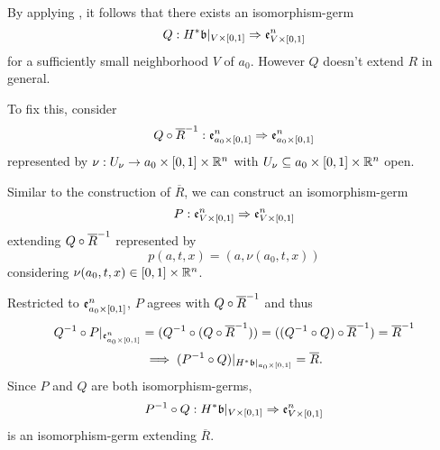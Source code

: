 \begin{myproof}
    By applying ,
    it follows that there exists an isomorphism-germ
    \[ Q: H^*\mathfrak{b}\vert_{V \times{} [0, 1]} \Rightarrow{} \mathfrak{e}^{n}_{V \times{} [0, 1]} \]
    for a sufficiently small neighborhood $V$ of $a_0$.
    However $Q$ doesn't extend $R$ in general.

    To fix this, consider
    \[ Q \circ \overline{R}^{-1}: \mathfrak{e}^{n}_{a_0 \times{} [0, 1]} \Rightarrow{} \mathfrak{e}^{n}_{a_0 \times{} [0, 1]} \]
    represented by $\nu: U_\nu \to a_0 \times{} [0, 1] \times \mathbb{R}^n$
    with $U_\nu \subseteq{} a_0 \times{} [0, 1] \times \mathbb{R}^n$ open.

    Similar to the construction of $\overline{R}$, we can construct an isomorphism-germ
    \[ P: \mathfrak{e}^{n}_{V \times{} [0, 1]} \Rightarrow{} \mathfrak{e}^{n}_{V \times{} [0, 1]} \]
    extending $Q \circ \overline{R}^{-1}$ represented by
    \[ p(a, t, x) = (a, \nu(a_0, t, x)) \]
    considering $\nu(a_0, t, x) \in [0, 1] \times \mathbb{R}^n$.

    Restricted to $\mathfrak{e}^{n}_{a_0 \times{} [0, 1]}$, $P$ agrees with $Q \circ \overline{R}^{-1}$ and thus
    \[
        Q^{-1} \circ P\vert_{\mathfrak{e}^{n}_{a_0 \times{} [0, 1]}}
        = (Q^{-1} \circ (Q \circ \overline{R}^{-1}))
        = ((Q^{-1} \circ Q) \circ \overline{R}^{-1})
        = \overline{R}^{-1}
    \]
    \[ \implies (P^{-1} \circ Q)\vert_{H^*\mathfrak{b}\vert_{a_0 \times{} [0, 1]}} = \overline{R}. \]
    Since $P$ and $Q$ are both isomorphism-germs,
    \[ P^{-1} \circ Q: H^*\mathfrak{b}\vert_{V \times{} [0, 1]} \Rightarrow{} \mathfrak{e}^{n}_{V \times{} [0, 1]} \]
    is an isomorphism-germ extending $\overline{R}$.
\end{myproof}

